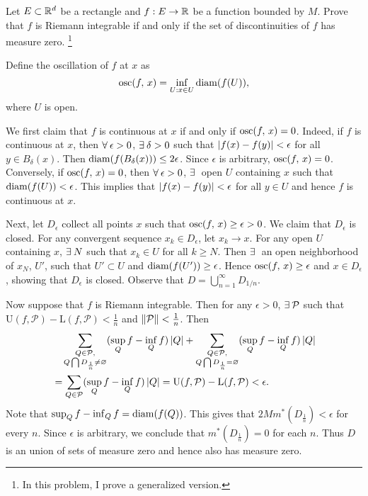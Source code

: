 \begin{problem}
    Let $E\subset\mathbb{R}^d$ be a rectangle and $f:E\to\mathbb{R}$ be a 
    function bounded by $M$. Prove that $f$ is Riemann 
    integrable if and only if the set of discontinuities of 
    $f$ has measure zero. \footnote{In this problem, I prove 
    a generalized version.}
\end{problem}
\begin{pf} 
    Define the oscillation of $f$ at $x$ as 
    \[
        \osc{f}{x} = \inf_{U:x\in U} \diam{f(U)},
    \]
    where $U$ is open. 
    
    We first claim that $f$ is continuous at $x$ if and only 
    if $\osc{f}{x}=0$. Indeed, if $f$ is continuous at $x$, 
    then $\forall\:\epsilon>0$, $\exists\:\delta>0$ such that 
    $\left\lvert {f(x)-f(y)} \right\rvert<\epsilon$ for all $y\in B_\delta(x)$. 
    Then $\diam{f(B_\delta(x))}\leq 2\epsilon$. Since 
    $\epsilon$ is arbitrary, $\osc{f}{x}=0$. Conversely, if 
    $\osc{f}{x}=0$, then $\forall\:\epsilon>0$, $\exists\:$ open 
    $U$ containing $x$ such that $\diam{f(U)}<\epsilon$. 
    This implies that $\left\lvert {f(x)-f(y)} \right\rvert<\epsilon$ for all 
    $y\in U$ and hence $f$ is continuous at $x$. 

    Next, let $D_\epsilon$ collect all points $x$ such that 
    $\osc{f}{x}\geq\epsilon>0$. We claim that $D_\epsilon$ 
    is closed. For any convergent sequence $x_k\in D_\epsilon$, 
    let $x_k\to x$. For any open $U$ containing $x$, $\exists\: N$ 
    such that $x_k\in U$ for all $k\geq N$. Then $\exists\:$ an 
    open neighborhood of $x_N$, $U'$, such that $U'\subset U$ 
    and $\diam{f(U')}\geq\epsilon$. Hence $\osc{f}{x}\geq
    \epsilon$ and $x\in D_\epsilon$, showing that $D_\epsilon$ 
    is closed. Observe that $D = \bigcup_{n=1}^{\infty}D_{1/n}$.
    
    Now suppose that $f$ is Riemann integrable. Then for any 
    $\epsilon>0$, $\exists\:\mathcal{P}$ such that $\mathrm{U}
    (f,\mathcal{P})-\mathrm{L}(f,\mathcal{P})<\frac{1}{n}$ and 
    $\left\lVert {\mathcal{P}} \right\rVert<\frac{1}{n}$. Then 
    \begin{equation*}
        \begin{split}
            &\quad\sum_{\substack{Q\in\mathcal{P},\\ Q\bigcap 
            D_\frac{1}{n}\neq\varnothing}} (\sup_Q f -\inf_Q f)\left\lvert {Q} \right\rvert 
            + \sum_{\substack{Q\in\mathcal{P}, \\ Q\bigcap 
            D_\frac{1}{n} = \varnothing}} (\sup_Q f -\inf_Q f)\left\lvert {Q} \right\rvert\\
            &= \sum_{Q\in\mathcal{P}}(\sup_Q f -\inf_Q f)\left\lvert {Q} \right\rvert 
            = \mathrm{U}(f,\mathcal{P})-\mathrm{L}(f,\mathcal{P}) 
            < \epsilon.
        \end{split}
    \end{equation*}
    Note that $\sup_Q f -\inf_Q f = \diam{f(Q)}$. This gives 
    that $2Mm^*(D_\frac{1}{n})<\epsilon$ for every $n$. Since 
    $\epsilon$ is arbitrary, we conclude that $m^*(D_\frac{1}{n}) 
    = 0$ for each $n$. Thus $D$ is an union of sets of measure 
    zero and hence also has measure zero. 


\end{pf}
